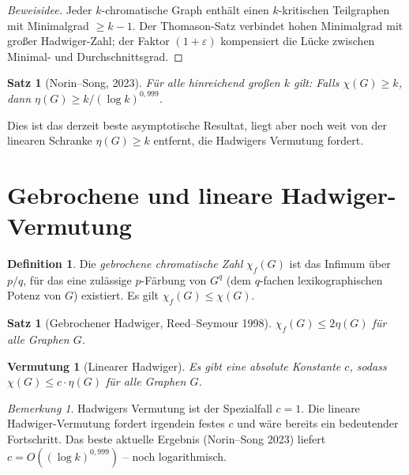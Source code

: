 \documentclass[12pt,a4paper]{amsart}
\newtheorem{satz}[theorem]{Satz}
\newtheorem{vermutung}[theorem]{Vermutung}
\theoremstyle{definition}
\newtheorem{definition_de}[theorem]{Definition}
\theoremstyle{remark}
\newtheorem{bemerkung}[theorem]{Bemerkung}
\begin{document}
\begin{proof}[Beweisidee]
Jeder $k$-chromatische Graph enthält einen $k$-kritischen Teilgraphen mit
Minimalgrad $\geq k-1$. Der Thomason-Satz verbindet hohen Minimalgrad mit
großer Hadwiger-Zahl; der Faktor $(1+\varepsilon)$ kompensiert die Lücke
zwischen Minimal- und Durchschnittsgrad.
\end{proof}

\begin{satz}[Norin--Song, 2023]\label{satz:NS23}
Für alle hinreichend großen $k$ gilt: Falls $\chi(G) \geq k$, dann
$\eta(G) \geq k/(\log k)^{0{,}999}$.
\end{satz}

Dies ist das derzeit beste asymptotische Resultat, liegt aber noch weit von der
linearen Schranke $\eta(G) \geq k$ entfernt, die Hadwigers Vermutung fordert.

\section{Gebrochene und lineare Hadwiger-Vermutung}

\begin{definition_de}
Die \emph{gebrochene chromatische Zahl} $\chi_f(G)$ ist das Infimum über $p/q$,
für das eine zulässige $p$-Färbung von $G^q$ (dem $q$-fachen lexikographischen
Potenz von $G$) existiert. Es gilt $\chi_f(G) \leq \chi(G)$.
\end{definition_de}

\begin{satz}[Gebrochener Hadwiger, Reed--Seymour 1998]\label{satz:fracHad}
$\chi_f(G) \leq 2\eta(G)$ für alle Graphen $G$.
\end{satz}

\begin{vermutung}[Linearer Hadwiger]\label{verm:linHad}
Es gibt eine absolute Konstante $c$, sodass $\chi(G) \leq c \cdot \eta(G)$
für alle Graphen $G$.
\end{vermutung}

\begin{bemerkung}
Hadwigers Vermutung ist der Spezialfall $c = 1$. Die lineare Hadwiger-Vermutung
fordert irgendein festes $c$ und wäre bereits ein bedeutender Fortschritt.
Das beste aktuelle Ergebnis (Norin--Song 2023) liefert $c = O((\log k)^{0{,}999})$ –
noch logarithmisch.
\end{bemerkung}
\end{document}
